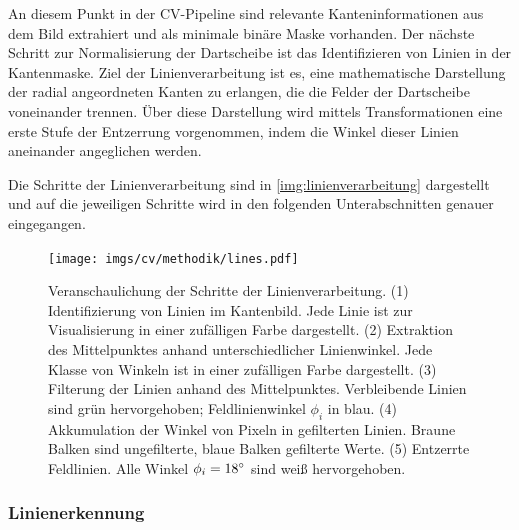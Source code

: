 An diesem Punkt in der CV-Pipeline sind relevante Kanteninformationen aus dem Bild extrahiert und als minimale binäre Maske vorhanden. Der nächste Schritt zur Normalisierung der Dartscheibe ist das Identifizieren von Linien in der Kantenmaske. Ziel der Linienverarbeitung ist es, eine mathematische Darstellung der radial angeordneten Kanten zu erlangen, die die Felder der Dartscheibe voneinander trennen. Über diese Darstellung wird mittels Transformationen eine erste Stufe der Entzerrung vorgenommen, indem die Winkel dieser Linien aneinander angeglichen werden.

Die Schritte der Linienverarbeitung sind in \autoref{img:linienverarbeitung} dargestellt und auf die jeweiligen Schritte wird in den folgenden Unterabschnitten genauer eingegangen.

\begin{figure}
    \centering
    \texttt{[image: imgs/cv/methodik/lines.pdf]}
    \caption{Veranschaulichung der Schritte der Linienverarbeitung. (1) Identifizierung von Linien im Kantenbild. Jede Linie ist zur Visualisierung in einer zufälligen Farbe dargestellt. (2) Extraktion des Mittelpunktes anhand unterschiedlicher Linienwinkel. Jede Klasse von Winkeln ist in einer zufälligen Farbe dargestellt. (3) Filterung der Linien anhand des Mittelpunktes. Verbleibende Linien sind grün hervorgehoben; Feldlinienwinkel $\phi_i$ in blau. (4) Akkumulation der Winkel von Pixeln in gefilterten Linien. Braune Balken sind ungefilterte, blaue Balken gefilterte Werte. (5) Entzerrte Feldlinien. Alle Winkel $\phi_i=18^{\circ}$ sind weiß hervorgehoben.}
    \label{img:linienverarbeitung}
\end{figure}

\subsubsection{Linienerkennung}
\label{sec:linienerkennung}

